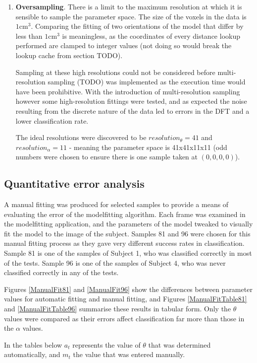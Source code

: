 \begin{enumerate}
	\item \textbf{Oversampling}.
		There is a limit to the maximum resolution at which it is sensible to sample the parameter space.
		The size of the voxels in the data is $1\text{cm}^3$.
		Comparing the fitting of two orientations of the model that differ by less than $1\text{cm}^3$ is meaningless,
		as the coordinates of every distance lookup performed are clamped to integer values (not doing so would break
		the lookup cache from section TODO).
		
		Sampling at these high resolutions could not be considered before multi-resolution sampling (TODO) was implemented
		as the execution time would have been prohibitive.
		With the introduction of multi-resolution sampling however some high-resolution fittings were tested, and as expected
		the noise resulting from the discrete nature of the data led to errors in the DFT and a lower classification rate.
		
		The ideal resolutions were discovered to be $resolution_\theta = 41$ and $resolution_\alpha = 11$ - meaning the
		parameter space is 41x41x11x11 (odd numbers were chosen to ensure there is one sample taken at $(0, 0, 0, 0)$).
\end{enumerate}


\subsection{Quantitative error analysis}

A manual fitting was produced for selected samples to provide a means of evaluating the error of the modelfitting algorithm.
Each frame was examined in the modelfitting application, and the parameters of the model tweaked to visually fit the model to the image of the subject.
Samples 81 and 96 were chosen for this manual fitting process as they gave very different success rates in classification.
Sample 81 is one of the samples of Subject 1, who was classified correctly in most of the tests.
Sample 96 is one of the samples of Subject 4, who was never classified correctly in any of the tests.

Figures \ref{ManualFit81} and \ref{ManualFit96} show the differences between parameter values for automatic fitting and manual fitting,
and Figures \ref{ManualFitTable81} and \ref{ManualFitTable96} summarise these results in tabular form.
Only the $\theta$ values were compared as their errors affect classification far more than those in the $\alpha$ values.

In the tables below $a_t$ represents the value of $\theta$ that was determined automatically, and $m_t$ the value that was entered manually.

